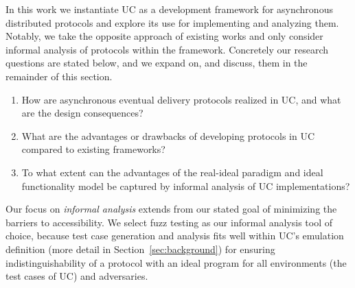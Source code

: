 

In this work we instantiate UC as a development framework for asynchronous distributed protocols and explore its use for implementing and analyzing them.
Notably, we take the opposite approach of existing works and only consider informal analysis of protocols within the framework.
Concretely our research questions are stated below, and we expand on, and discuss, them in the remainder of this section.
\begin{enumerate}
\item How are asynchronous eventual delivery protocols realized in UC, and what are the design consequences?
\item What are the advantages or drawbacks of developing protocols in UC compared to existing frameworks?
\item To what extent can the advantages of the real-ideal paradigm and ideal functionality model be captured by informal analysis of UC implementations?
\end{enumerate}
Our focus on \emph{informal analysis} extends from our stated goal of minimizing the barriers to accessibility.
We select fuzz testing as our informal analysis tool of choice, because test case generation and analysis fits well within UC's emulation definition (more detail in Section~\ref{sec:background}) for ensuring indistinguishability of a protocol with an ideal program for all environments (the test cases of UC) and adversaries.

